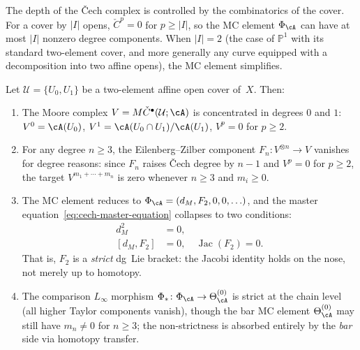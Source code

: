 The depth of the \v{C}ech complex is controlled by the
combinatorics of the cover. For a cover by $|I|$ opens,
$\check{C}^p = 0$ for $p \geq |I|$, so the MC element
$\Phi_\cA$ can have at most $|I|$ nonzero degree components.
When $|I| = 2$ (the case of $\mathbb{P}^1$ with its standard
two-element cover, and more generally any curve equipped with a
decomposition into two affine opens), the MC element simplifies.

\begin{proposition}
\label{prop:cech-two-element-strict}
Let $\mathcal{U} = \{U_0, U_1\}$ be a two-element affine open
cover of~$X$. Then:
\begin{enumerate}[label=\textup{(\roman*)}]
\item The Moore complex $V = M\check{C}^\bullet(\mathcal{U};\cA)$
 is concentrated in degrees $0$ and $1$:
 $V^0 = \cA(U_0)$,\;
 $V^1 = \cA(U_0 \cap U_1)/\cA(U_1)$,\;
 $V^p = 0$ for $p \geq 2$.
\item For any degree $n \geq 3$, the Eilenberg--Zilber component
 $F_n\colon V^{\otimes n} \to V$ vanishes for degree reasons:
 since $F_n$ raises \v{C}ech degree by $n{-}1$ and $V^p = 0$
 for $p \geq 2$, the target $V^{m_1 + \cdots + m_n}$ is zero
 whenever $n \geq 3$ and $m_i \geq 0$.
\item The MC element reduces to
 $\Phi_\cA = (d_M, F_2, 0, 0, \ldots)$, and the master
 equation~\eqref{eq:cech-master-equation} collapses to
 two conditions:
 \begin{align}
 d_M^2 &= 0, \label{eq:two-element-dm} \\
 [d_M, F_2] &= 0,\quad
 \operatorname{Jac}(F_2) = 0.
 \label{eq:two-element-jacobi}
 \end{align}
 That is, $F_2$ is a \emph{strict} dg~Lie bracket: the Jacobi
 identity holds on the nose, not merely up to homotopy.
\item The comparison $L_\infty$ morphism
 $\Phi_*\colon \Phi_\cA \to \Theta^{(0)}_\cA$ is strict
 at the chain level (all higher Taylor components vanish),
 though the bar MC element $\Theta^{(0)}_\cA$ may still have
 $m_n \neq 0$ for $n \geq 3$; the non-strictness is
 absorbed entirely by the \emph{bar} side via homotopy transfer.
\end{enumerate}
\end{proposition}

